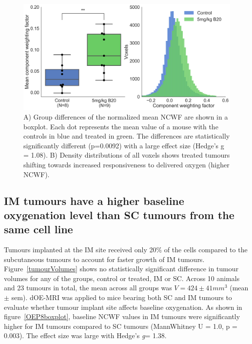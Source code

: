 \begin{figure}[htbp]
   \centering
   \includegraphics[width=\textwidth]{oemri_thesis3/oemri_thesis3-images/2_aarts3_b20_boxplot_dOEMRI.png} %
   \caption{A) Group differences of the normalized mean \acs{NCWF} are shown in a boxplot.
   Each dot represents the mean value of a mouse with the controls in blue and treated in green.
   The differences are statistically significantly different (p=0.0092) with a large effect size (Hedge's g = 1.08).
   B) Density distributions of all voxels shows treated tumours shifting towards increased responsiveness to delivered oxygen (higher \acs{NCWF}).}
   \label{aarts3boxplot}
\end{figure}

\subsection{\acs{IM} tumours have a higher baseline oxygenation level than \acs{SC} tumours from the same cell line}

Tumours implanted at the \acs{IM} site received only 20\% of the cells compared to the subcutaneous tumours to account for faster growth of \acs{IM} tumours.
Figure~\ref{tumourVolumes} shows no statistically significant difference in tumour volumes for any of the groups, control or treated, \acs{IM} or \acs{SC}. 
Across 10 animals and 23 tumours in total, the mean across all groups was $V = 424 \pm 41 mm^3$ (mean $\pm$ sem). 
\ac{dOE-MRI} was applied to mice bearing both \acs{SC} and \acs{IM} tumours to evaluate whether tumour implant site affects baseline oxygenation. 
As shown in figure~\ref{OEP8boxplot}, baseline \acs{NCWF} values in \acs{IM} tumours were significantly higher for \acs{IM} tumours compared to \acs{SC} tumours (MannWhitney U = 1.0, p = 0.003).
The effect size was large with Hedge's \emph{g}= 1.38.

